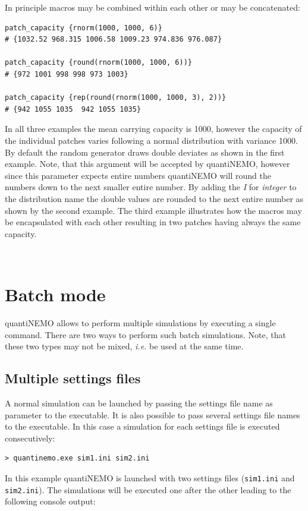 \documentclass[letterpaper,12pt,oneside]{book}
\begin{document}
In principle macros may be combined within each other or may be concatenated:
\begin{lstlisting}[frame=single]
patch_capacity {rnorm(1000, 1000, 6)}
# {1032.52 968.315 1006.58 1009.23 974.836 976.087}

patch_capacity {round(rnorm(1000, 1000, 6))}
# {972 1001 998 998 973 1003}

patch_capacity {rep(round(rnorm(1000, 1000, 3), 2))}
# {942 1055 1035  942 1055 1035}
\end{lstlisting}
In all three examples the mean carrying capacity is 1000, however the capacity of the individual patches varies following a normal distribution with variance 1000. By default the random generator draws double deviates as shown in the first example. Note, that this argument will be accepted by quantiNEMO, however since this parameter expects entire numbers quantiNEMO will round the numbers down to the next smaller entire number. By adding the \textit{I} for \textit{integer} to the distribution name the double values are rounded to the next entire number as shown by the second example. The third example illustrates how the macros may be encapsulated with each other resulting in two patches having always the same capacity.


\


\section{Batch mode}\label{batchMode}
quantiNEMO allows to perform multiple simulations by executing a single command. There are two ways to perform such batch simulations. Note, that these two types may not be mixed, \textit{i.e.} be used at the same time.

\subsection{Multiple settings files}\label{multiFiles}
A normal simulation can be launched by passing the settings file name as parameter to the executable. It is also possible to pass several settings file names to the executable. In this case a simulation for each settings file is executed consecutively: 
\begin{lstlisting}[frame=single]
> quantinemo.exe sim1.ini sim2.ini
\end{lstlisting}
In this example quantiNEMO is launched with two settings files (\texttt{sim1.ini} and \texttt{sim2.ini}). The simulations will be executed one after the other leading to the following console output:
\end{document}
